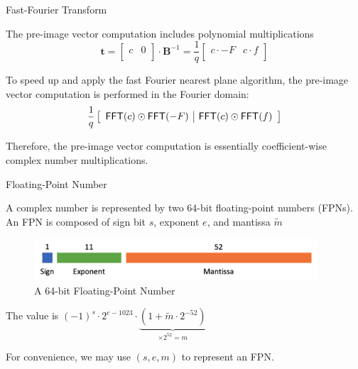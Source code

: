 \begin{frame}{Fast-Fourier Transform}

The pre-image vector computation includes polynomial multiplications
\[
\textbf{t} = \left[ \begin{array}{c|c} c & 0 \\ \end{array} \right] \cdot \mathbf{B}^{-1}
= \frac{1}{q} \left[ \begin{array}{c|c} c \cdot -F & c \cdot f \\ \end{array} \right]
\]
\pause

To speed up and apply the fast Fourier nearest plane algorithm, the pre-image vector computation is performed in the Fourier domain:
\[
\frac{1}{q} \left[ \begin{array}{c|c} {\sf FFT}(c) \odot {\sf FFT}(-F) & {\sf FFT}(c) \odot {\sf FFT}(f) \end{array} \right]
\]
\pause

Therefore, the pre-image vector computation is essentially coefficient-wise complex number multiplications.

\end{frame}


\begin{frame}{Floating-Point Number}

A complex number is represented by two 64-bit floating-point numbers (FPNs). An FPN is composed of sign bit $s$, exponent $e$, and mantissa $\tilde{m}$

\begin{figure}
    \centering
    \includegraphics[width = 300pt]{Figure/fpu.png}
    \caption{A 64-bit Floating-Point Number}
    \label{fig:64bitfpr}
\end{figure}

The value is $(-1)^s \cdot 2^{e - 1023} \cdot \underbrace{(1 + \tilde{m} \cdot 2^{-52})}_{\times 2^{52} = m}$

For convenience, we may use $(s, e, m)$ to represent an FPN.

\end{frame}


